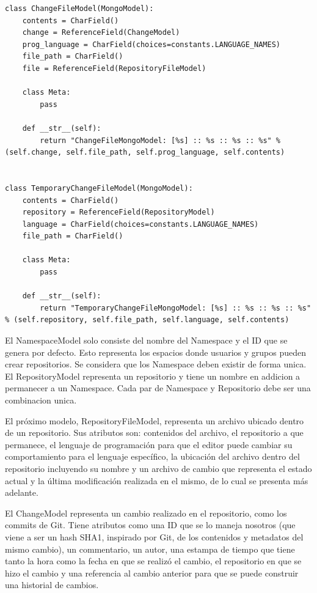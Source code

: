 \begin{lstlisting}[breaklines]
class ChangeFileModel(MongoModel):
    contents = CharField()
    change = ReferenceField(ChangeModel)
    prog_language = CharField(choices=constants.LANGUAGE_NAMES)
    file_path = CharField()
    file = ReferenceField(RepositoryFileModel)

    class Meta:
        pass

    def __str__(self):
        return "ChangeFileMongoModel: [%s] :: %s :: %s :: %s" % (self.change, self.file_path, self.prog_language, self.contents)


class TemporaryChangeFileModel(MongoModel):
    contents = CharField()
    repository = ReferenceField(RepositoryModel)
    language = CharField(choices=constants.LANGUAGE_NAMES)
    file_path = CharField()

    class Meta:
        pass

    def __str__(self):
        return "TemporaryChangeFileMongoModel: [%s] :: %s :: %s :: %s" % (self.repository, self.file_path, self.language, self.contents)
\end{lstlisting}
\lstset{language=Bash}


El NamespaceModel solo consiste del nombre del Namespace y el ID que se genera por defecto. Esto representa los espacios donde usuarios y grupos pueden crear repositorios. Se considera que los Namespace deben existir de forma unica. El RepositoryModel representa un repositorio y tiene un nombre en addicion a permanecer a un Namespace. Cada par de Namespace y Repositorio debe ser una combinacion unica.

El próximo modelo, RepositoryFileModel, representa un archivo ubicado dentro de un repositorio. Sus atributos son: contenidos del archivo, el repositorio a que permanece, el lenguaje de programación para que el editor puede cambiar su comportamiento para el lenguaje específico, la ubicación del archivo dentro del repositorio incluyendo su nombre y un archivo de cambio que representa el estado actual y la última modificación realizada en el mismo, de lo cual se presenta más adelante.

El ChangeModel representa un cambio realizado en el repositorio, como los commits de Git. Tiene atributos como una ID que se lo maneja nosotros (que viene a ser un hash SHA1, inspirado por Git, de los contenidos y metadatos del mismo cambio), un commentario, un autor, una estampa de tiempo que tiene tanto la hora como la fecha en que se realizó el cambio, el repositorio en que se hizo el cambio y una referencia al cambio anterior para que se puede construir una historial de cambios.

